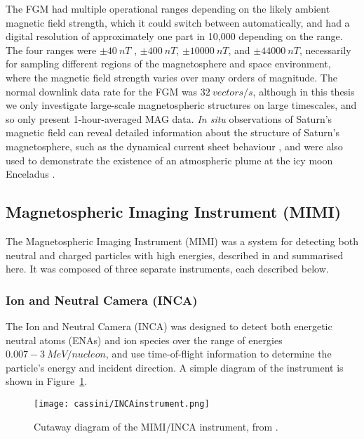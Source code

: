 The FGM had multiple operational ranges depending on the likely ambient magnetic field strength, which it could switch between automatically, and had a digital resolution of approximately one part in 10,000 depending on the range. The four ranges were $\pm\SI{40}{nT}$ , $\pm\SI{400}{nT}$, $\pm\SI{10000}{nT}$, and $\pm\SI{44000}{nT}$, necessarily for sampling different regions of the magnetosphere and space environment, where the magnetic  field strength  varies over many orders of magnitude. The normal downlink data rate for the FGM was $\SI{32}{vectors/s}$, although in this thesis we only investigate large-scale magnetospheric structures on large timescales, and so only present 1-hour-averaged MAG data. \textit{In situ} observations of Saturn's magnetic field can reveal detailed information about the structure of Saturn's magnetosphere, such as the dynamical current sheet behaviour \citep[e.g.][]{provan2012}, and were also used to demonstrate the existence of an atmospheric plume at the icy moon Enceladus \citep{dougherty2006}.

\subsection{Magnetospheric Imaging Instrument (MIMI)}
The Magnetospheric Imaging Instrument (MIMI) was a system for detecting both neutral and charged particles with high energies, described in \citet{krimigis2004} and summarised here. It was composed of three separate instruments, each described below.
\subsubsection{Ion and Neutral Camera (INCA)}
The Ion and Neutral Camera (INCA) was designed to detect both energetic neutral atoms (ENAs) and ion species over the range of energies $0.007-\SI{3}{MeV/nucleon}$, and use time-of-flight information to determine the particle's energy and incident direction. A simple diagram of the instrument is shown in Figure~\ref{cassini:fig:INCAinstrument}.

\begin{figure}
\centering
\noindent\texttt{[image: cassini/INCAinstrument.png]}
\caption[Diagram of the MIMI/INCA instrument.]{Cutaway diagram of the MIMI/INCA instrument, from \citet{krimigis2004}.}
\label{cassini:fig:INCAinstrument}
\end{figure}

